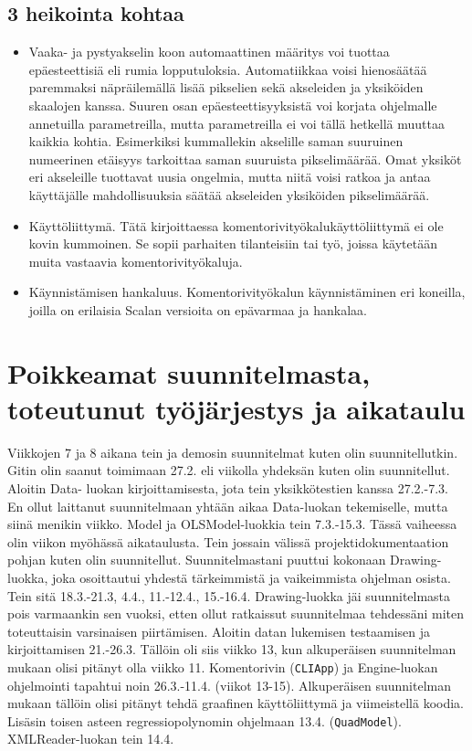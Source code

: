 \documentclass{article}
\begin{document}
	\subsection{3 heikointa kohtaa}
	\begin{itemize}
		\item Vaaka- ja pystyakselin koon automaattinen määritys voi tuottaa epäesteettisiä eli rumia
			  lopputuloksia. Automatiikkaa voisi hienosäätää paremmaksi näpräilemällä lisää pikselien sekä
			  akseleiden ja yksiköiden skaalojen kanssa. Suuren osan epäesteettisyyksistä
			  voi korjata ohjelmalle annetuilla parametreilla, mutta parametreilla ei voi tällä hetkellä
			  muuttaa kaikkia kohtia. Esimerkiksi kummallekin akselille saman suuruinen numeerinen
			  etäisyys tarkoittaa saman suuruista pikselimäärää. Omat yksiköt eri akseleille tuottavat
			  uusia ongelmia, mutta niitä voisi ratkoa ja antaa käyttäjälle mahdollisuuksia säätää
			  akseleiden yksiköiden pikselimäärää.
		\item Käyttöliittymä. Tätä kirjoittaessa komentorivityökalukäyttöliittymä ei ole kovin kummoinen. Se
                      sopii parhaiten tilanteisiin tai työ, joissa käytetään muita vastaavia komentorivityökaluja.
		\item Käynnistämisen hankaluus. Komentorivityökalun käynnistäminen eri koneilla, joilla on erilaisia
                      Scalan versioita on epävarmaa ja hankalaa.
	\end{itemize}

\section{Poikkeamat suunnitelmasta, toteutunut työjärjestys ja aikataulu}

        Viikkojen 7 ja 8 aikana tein ja demosin suunnitelmat kuten olin suunnitellutkin. Gitin olin
        saanut toimimaan 27.2. eli viikolla yhdeksän kuten olin suunnitellut. Aloitin Data-
        luokan kirjoittamisesta, jota tein yksikkötestien kanssa 27.2.-7.3. En ollut laittanut
        suunnitelmaan yhtään aikaa Data-luokan tekemiselle, mutta siinä menikin viikko. Model ja
        OLSModel-luokkia tein 7.3.-15.3. Tässä vaiheessa olin viikon myöhässä aikataulusta.
        Tein jossain välissä projektidokumentaation pohjan kuten olin suunnitellut. Suunnitelmastani
        puuttui kokonaan Drawing-luokka, joka osoittautui yhdestä tärkeimmistä ja vaikeimmista
        ohjelman osista. Tein sitä 18.3.-21.3, 4.4., 11.-12.4., 15.-16.4. Drawing-luokka jäi
        suunnitelmasta pois varmaankin sen vuoksi, etten ollut ratkaissut suunnitelmaa tehdessäni
        miten toteuttaisin varsinaisen piirtämisen.
        Aloitin datan lukemisen testaamisen ja kirjoittamisen 21.-26.3. Tällöin oli siis viikko 13,
        kun alkuperäisen suunnitelman mukaan olisi pitänyt olla viikko 11. Komentorivin
        (\texttt{CLIApp}) ja Engine-luokan ohjelmointi tapahtui noin 26.3.-11.4. (viikot 13-15).
        Alkuperäisen suunnitelman mukaan tällöin olisi pitänyt tehdä graafinen käyttöliittymä
        ja viimeistellä koodia. Lisäsin toisen asteen regressiopolynomin ohjelmaan 13.4.
        (\texttt{QuadModel}). XMLReader-luokan tein 14.4.
\end{document}
